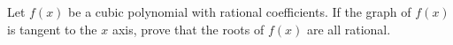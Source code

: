 Let $f(x)$ be a cubic polynomial with rational coefficients. If the graph of $f(x)$ is tangent to the $x$ axis, prove that the roots of $f(x)$ are all rational.